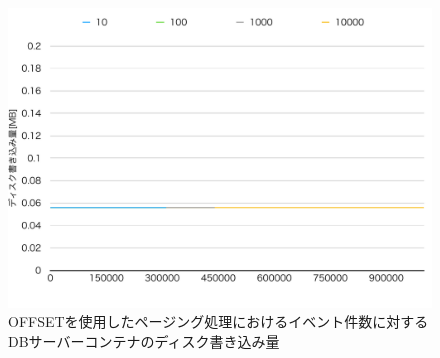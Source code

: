 \documentclass[../../../../../main]{subfiles}
\begin{document}
    \begin{figure}[H]
        \centering
        \includegraphics[width=12cm]{graph}
        \caption{OFFSETを使用したページング処理におけるイベント件数に対するDBサーバーコンテナのディスク書き込み量}
        \label{fig:paging-offset-db-disk-in-app_1_1024-db_1_1024}
    \end{figure}
\end{document}
